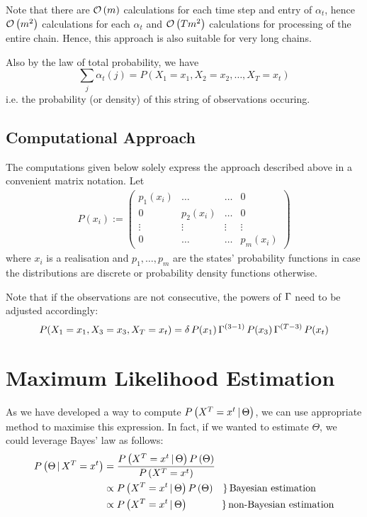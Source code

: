 Note that there are $\mathcal{O}\left(m\right)$ calculations for each time step and entry of $\alpha_t$, hence $\mathcal{O}\left(m^2\right)$ calculations for each $\alpha_t$ and $\mathcal{O}\left(T m^2\right)$ calculations for processing of the entire chain. Hence, this approach is also suitable for very long chains.
 
Also by the law of total probability, we have
\[
\sum_j \alpha_t(j) = P\left(X_1 = x_1, X_2 = x_2, \dots, X_T = x_t \right)
\] 
i.e. the probability (or density) of this string of observations occuring. 


\subsection{Computational Approach}

The computations given below solely express the approach described above in a convenient matrix notation. 
Let 
\begin{align*}
	P(x_i) := \begin{pmatrix}
		p_1(x_i) & \dots    & \dots & 0  \\
		0        & p_2(x_i) & \dots & 0  \\
		\vdots   & \vdots   & \vdots& \vdots \\ 
		0        & \dots    & \dots & p_m(x_i)
	\end{pmatrix}
\end{align*}
where $x_i$ is a realisation and $p_1, \dots, p_m$ are the states' probability functions in case the distributions are discrete or probability density functions otherwise. 


Note that if the observations are not consecutive, the powers of $\Gamma$ need to be adjusted accordingly:
\[
P(X_1 = x_1, X_3 = x_3, X_T = x_t) = \delta \,  P(x_1) \, \Gamma^{(3-1)} \,  P(x_3) \,  \Gamma^{(T-3)} \, P(x_t)
\]



\section{Maximum Likelihood Estimation}

As we have developed a way to compute $P\left(X^T=x^t \, | \, \Theta\right)$, we can use appropriate method to maximise this expression. In fact, if we wanted to estimate $\Theta$, we could leverage Bayes' law as follows:
\begin{align}
	P\left(\Theta \, | \, X^T=x^t\right) &= \frac{P\left(X^T=x^t \, | \, \Theta\right) P \left(\Theta\right)}{P \left(X^T=x^t\right)} \\
		&\propto P\left(X^T=x^t \, | \, \Theta\right) P \left(\Theta\right)  \quad \} \, \text{Bayesian estimation} \\
		&\propto P\left(X^T=x^t \, | \, \Theta\right) \quad \quad \quad \; \; \} \, \text{non-Bayesian estimation}
	\label{bay_estimate}
\end{align}

